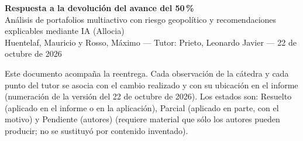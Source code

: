 \documentclass[a4paper,11pt]{article}
\newcommand{\ok}{\textcolor{green!45!black}{Resuelto}}
\newcommand{\parc}{\textcolor{orange!80!black}{Parcial}}
\newcommand{\pend}{\textcolor{red!70!black}{Pendiente (autores)}}
\begin{document}
\begin{center}
{\LARGE\bfseries Respuesta a la devolución del avance del 50\,\%}\\[6pt]
{\large Análisis de portafolios multiactivo con riesgo geopolítico y recomendaciones explicables mediante IA (Allocia)}\\[4pt]
Huentelaf, Mauricio y Rosso, Máximo --- Tutor: Prieto, Leonardo Javier --- 22 de octubre de 2026
\end{center}

Este documento acompaña la reentrega. Cada observación de la cátedra y cada punto del tutor se asocia con el cambio realizado y con su ubicación en el informe (numeración de la versión del 22 de octubre de 2026). Los estados son: \ok{} (aplicado en el informe o en la aplicación), \parc{} (aplicado en parte, con el motivo) y \pend{} (requiere material que sólo los autores pueden producir; no se sustituyó por contenido inventado).
\end{document}
